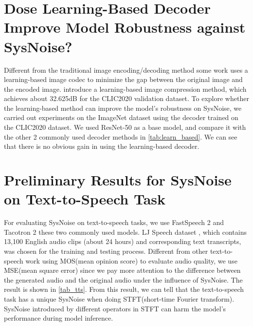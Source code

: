 \section{Dose Learning-Based Decoder Improve Model Robustness against SysNoise?}
\label{learningbaseddecoder}
Different from the traditional image encoding/decoding method some work uses a learning-based image codec to minimize the gap between the original image and the encoded image. \cite{learningbased} introduce a learning-based image compression method, which achieves about 32.625dB for the CLIC2020 validation dataset. To explore whether the learning-based method can improve the model's robustness on SysNoise, we carried out experiments on the ImageNet dataset using the decoder trained on the CLIC2020 dataset. We used ResNet-50 as a base model, and compare it with the other 2 commonly used decoder methods in \autoref{tab:learn_based}. We can see that there is no obvious gain in using the learning-based decoder.


\begin{table}[htbp]
\centering
\caption{Compare Performance on Learning-Based Decoder}
\label{tab:learn_based}
\end{table}

\section{Preliminary Results for SysNoise on Text-to-Speech Task}
For evaluating SysNoise on text-to-speech tasks, we use FastSpeech 2 \cite{FastSpeech2} and Tacotron 2 \cite{Tacotron2} these two commonly used models. LJ Speech dataset \cite{ljspeech17}, which contains 13,100 English audio clips (about 24 hours) and corresponding text transcripts, was chosen for the training and testing process. Different from other text-to-speech work using MOS(mean opinion score) to evaluate audio quality, we use MSE(mean square error) since we pay more attention to the difference between the generated audio and the original audio under the influence of SysNoise. The result is shown in \autoref{tab_tts}.
From this result, we can tell that the text-to-speech task has a unique SysNoise when doing STFT(short-time Fourier transform). SysNoise introduced by different operators in STFT can harm the model's performance during model inference.

